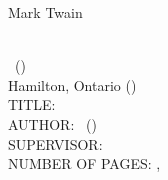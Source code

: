 \documentclass[
11pt, %
oneside, %
english, %
singlespacing, %
]{macthesis} %
\def\blankpage{%
      \clearpage%
      \thispagestyle{empty}%
      \addtocounter{page}{-1}%
      \null%
      \clearpage}
\begin{document}
\hfill\textemdash Mark Twain

\blankpage
\clearpage




\blankpage
\clearpage


\newpage
{} %
\setcounter{page}{2} %

\noindent %
\univname \\
\degreename\, (\the\year) \\
Hamilton, Ontario (\deptname) \\[1.5cm]
TITLE: \ttitle \\
AUTHOR: \authorname\,  %
(\univname)  \\
SUPERVISOR: \supname\, \\
NUMBER OF PAGES: \pageref{lastoffront}, \pageref{LastPage}  %

\clearpage

\end{document}
